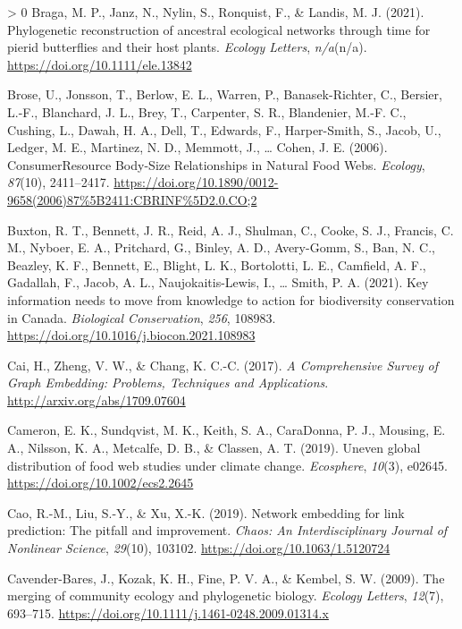 \documentclass[10pt,oneside]{article}
\newlength{\cslhangindent}
\newenvironment{CSLReferences}[3] %
 {%
  \setlength{\parindent}{0pt}
  \ifodd #1 \everypar{\setlength{\hangindent}{\cslhangindent}}\ignorespaces\fi
  \ifnum #2 > 0
  \setlength{\parskip}{#2\baselineskip}
  \fi
 }%
 {}
\begin{document}
\begin{CSLReferences}{1}{0}
\leavevmode\hypertarget{ref-Braga2021PhyRec}{}%
Braga, M. P., Janz, N., Nylin, S., Ronquist, F., \& Landis, M. J.
(2021). Phylogenetic reconstruction of ancestral ecological networks
through time for pierid butterflies and their host plants. \emph{Ecology
Letters}, \emph{n/a}(n/a). \url{https://doi.org/10.1111/ele.13842}

\leavevmode\hypertarget{ref-Brose2006ConRes}{}%
Brose, U., Jonsson, T., Berlow, E. L., Warren, P., Banasek-Richter, C.,
Bersier, L.-F., Blanchard, J. L., Brey, T., Carpenter, S. R.,
Blandenier, M.-F. C., Cushing, L., Dawah, H. A., Dell, T., Edwards, F.,
Harper-Smith, S., Jacob, U., Ledger, M. E., Martinez, N. D., Memmott,
J., \ldots{} Cohen, J. E. (2006). ConsumerResource Body-Size
Relationships in Natural Food Webs. \emph{Ecology}, \emph{87}(10),
2411--2417.
\url{https://doi.org/10.1890/0012-9658(2006)87\%5B2411:CBRINF\%5D2.0.CO;2}

\leavevmode\hypertarget{ref-Buxton2021KeyInf}{}%
Buxton, R. T., Bennett, J. R., Reid, A. J., Shulman, C., Cooke, S. J.,
Francis, C. M., Nyboer, E. A., Pritchard, G., Binley, A. D., Avery-Gomm,
S., Ban, N. C., Beazley, K. F., Bennett, E., Blight, L. K., Bortolotti,
L. E., Camfield, A. F., Gadallah, F., Jacob, A. L., Naujokaitis-Lewis,
I., \ldots{} Smith, P. A. (2021). Key information needs to move from
knowledge to action for biodiversity conservation in Canada.
\emph{Biological Conservation}, \emph{256}, 108983.
\url{https://doi.org/10.1016/j.biocon.2021.108983}

\leavevmode\hypertarget{ref-Cai2017ComSur}{}%
Cai, H., Zheng, V. W., \& Chang, K. C.-C. (2017). \emph{A Comprehensive
Survey of Graph Embedding: Problems, Techniques and Applications}.
\url{http://arxiv.org/abs/1709.07604}

\leavevmode\hypertarget{ref-Cameron2019UneGlo}{}%
Cameron, E. K., Sundqvist, M. K., Keith, S. A., CaraDonna, P. J.,
Mousing, E. A., Nilsson, K. A., Metcalfe, D. B., \& Classen, A. T.
(2019). Uneven global distribution of food web studies under climate
change. \emph{Ecosphere}, \emph{10}(3), e02645.
\url{https://doi.org/10.1002/ecs2.2645}

\leavevmode\hypertarget{ref-Cao2019NetEmb}{}%
Cao, R.-M., Liu, S.-Y., \& Xu, X.-K. (2019). Network embedding for link
prediction: The pitfall and improvement. \emph{Chaos: An
Interdisciplinary Journal of Nonlinear Science}, \emph{29}(10), 103102.
\url{https://doi.org/10.1063/1.5120724}

\leavevmode\hypertarget{ref-Cavender-Bares2009MerCom}{}%
Cavender-Bares, J., Kozak, K. H., Fine, P. V. A., \& Kembel, S. W.
(2009). The merging of community ecology and phylogenetic biology.
\emph{Ecology Letters}, \emph{12}(7), 693--715.
\url{https://doi.org/10.1111/j.1461-0248.2009.01314.x}


\end{CSLReferences}
\end{document}
